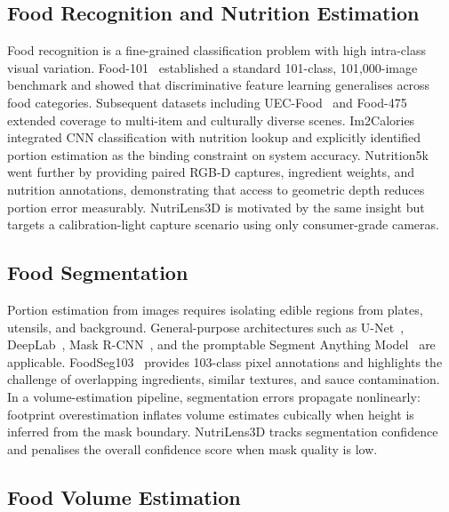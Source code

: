 \documentclass[conference]{IEEEtran}
\begin{document}
\subsection{Food Recognition and Nutrition Estimation}

Food recognition is a fine-grained classification problem with high intra-class
visual variation. Food-101~\cite{bossard2014food101} established a standard
101-class, 101{,}000-image benchmark and showed that discriminative feature
learning generalises across food categories. Subsequent datasets including
UEC-Food~\cite{matsuda2012multiple} and Food-475~\cite{ciocca2017food}
extended coverage to multi-item and culturally diverse scenes.
Im2Calories~\cite{meyers2015im2calories} integrated CNN classification with
nutrition lookup and explicitly identified portion estimation as the binding
constraint on system accuracy. Nutrition5k~\cite{thames2021nutrition5k} went
further by providing paired RGB-D captures, ingredient weights, and nutrition
annotations, demonstrating that access to geometric depth reduces portion error
measurably. NutriLens3D is motivated by the same insight but targets a
calibration-light capture scenario using only consumer-grade cameras.

\subsection{Food Segmentation}

Portion estimation from images requires isolating edible regions from plates,
utensils, and background. General-purpose architectures such as
U-Net~\cite{ronneberger2015unet}, DeepLab~\cite{chen2018deeplab},
Mask R-CNN~\cite{he2017mask}, and the promptable Segment
Anything Model~\cite{kirillov2023sam} are applicable.
FoodSeg103~\cite{wu2021foodseg103} provides 103-class pixel annotations and
highlights the challenge of overlapping ingredients, similar textures, and
sauce contamination. In a volume-estimation pipeline, segmentation errors
propagate nonlinearly: footprint overestimation inflates volume estimates
cubically when height is inferred from the mask boundary. NutriLens3D tracks
segmentation confidence and penalises the overall confidence score when
mask quality is low.

\subsection{Food Volume Estimation}
\end{document}
